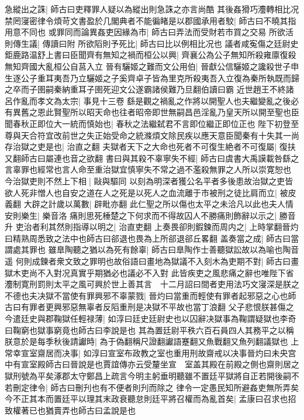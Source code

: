 急縱出之誅|{
	師古曰吏釋罪人疑以為縱出則急誅之亦言尚酷}
其後姦猾巧灋轉相比况禁罔寖密律令煩苛文書盈於几閣典者不能徧睹是以郡國承用者駮|{
	師古曰不曉其指用意不同也}
或罪同而論異姦吏因緣為市|{
	師古曰弄法而受財若市買之交易}
所欲活則傳生議|{
	傳讀曰附}
所欲䧟則予死比|{
	師古曰比以例相比况也}
議者咸寃傷之廷尉史鉅鹿路温舒上書曰臣聞齊有無知之禍而桓公以興|{
	齊襄公為公子無知所殺雍廪復殺無知齊國大亂桓公自莒入立}
晉有驪姬之難而文公用伯|{
	晉獻公信驪姬之讒殺世子申生逐公子重耳夷吾乃立驪姬之子奚齊卓子皆為里克所殺夷吾入立復為秦所執既而歸之卒而子圉嗣秦納重耳子圉死迎文公遂霸諸侯難乃旦翻伯讀曰霸}
近世趙王不終諸呂作亂而孝文為太宗|{
	事見十三卷}
繇是觀之禍亂之作將以開聖人也夫繼變亂之後必有異舊之恩此賢聖所以昭天命也往者昭帝即世無嗣昌邑淫亂乃皇天所以開至聖也臣聞春秋正即位大一統而慎始也|{
	春秋之法繼弑君不言即位繼正即位正也}
陛下初登至尊與天合符宜改前世之失正始受命之統滌煩文除民疾以應天意臣聞秦有十失其一尚存治獄之吏是也|{
	治直之翻}
夫獄者天下之大命也死者不可復生絶者不可復屬|{
	復扶又翻師古曰屬連也音之欲翻}
書曰與其殺不辜寧失不經|{
	師古曰虞書大禹謨載咎繇之言辜罪也經常也言人命至重治獄宜慎寧失不常之過不濫殺無罪之人所以崇寛恕也}
今治獄吏則不然上下相|{
	敺與驅同}
以刻為明深者獲公名平者多後患故治獄之吏皆欲人死非憎人也自安之道在人之死是以死人之血流離于市被刑之徒比肩而立|{
	被皮義翻}
大辟之計歲以萬數|{
	辟毗亦翻}
此仁聖之所以傷也太平之未洽凡以此也夫人情安則樂生|{
	樂音洛}
痛則思死棰楚之下何求而不得故囚人不勝痛則飾辭以示之|{
	勝音升}
吏治者利其然則指導以明之|{
	治直吏翻}
上奏畏卻則鍜鍊而周内之|{
	上時掌翻晉灼曰精熟周悉致之法中也師古曰郤退也畏為上所郤退郤丘畧翻}
盖奏當之成|{
	師古曰當謂處其罪也}
雖臯陶聽之猶以為死有餘辜|{
	師古曰臯陶作士善聽獄訟故以為喻也陶音遥}
何則成鍊者衆文致之罪明也故俗語曰畫地為獄議不入刻木為吏期不對|{
	師古曰畫獄木吏尚不入對况真實乎期猶必也議必不入對}
此皆疾吏之風悲痛之辭也唯陛下省灋制寛刑罰則太平之風可興於世上善其言　十二月詔曰間者吏用法巧文寖深是朕之不德也夫决獄不當使有罪興邪不辜蒙戮|{
	晉灼曰當重而輕使有罪者起邪惡之心也師古曰有罪者更興邪惡無辜者反䧟重刑是决獄不平故也當丁浪翻}
父子悲恨朕甚傷之今遣廷史與郡鞠獄任輕禄薄|{
	如淳曰廷史廷尉史也以囚辭决獄事為鞠謂疑獄也李奇曰鞠窮也獄事窮竟也師古曰李說是也}
其為置廷尉平秩六百石員四人其務平之以稱朕意於是每季秋後請讞時|{
	為于偽翻稱尺證翻讞語蹇翻又魚戰翻又魚列翻議獄也}
上常幸宣室齋居而决事|{
	如淳曰宣室布政教之室也重用刑故齋戒以决事晉灼曰未央宫中有宣室殿師古曰晉說是也賈誼傳亦云受釐坐宣　室盖其殿在前殿之側也齋則居之}
獄刑號為平矣涿郡太守鄭昌上疏言今明主躬垂明聽雖不置廷平獄將自正若開後嗣不若刪定律令|{
	師古曰刪刋也有不便者則刋而除之}
律令一定愚民知所避姦吏無所弄矣今不正其本而置廷平以理其末政衰聽怠則廷平將召權而為亂首矣|{
	孟康曰召求也招致權著已也猶賣弄也師古曰孟說是也}
